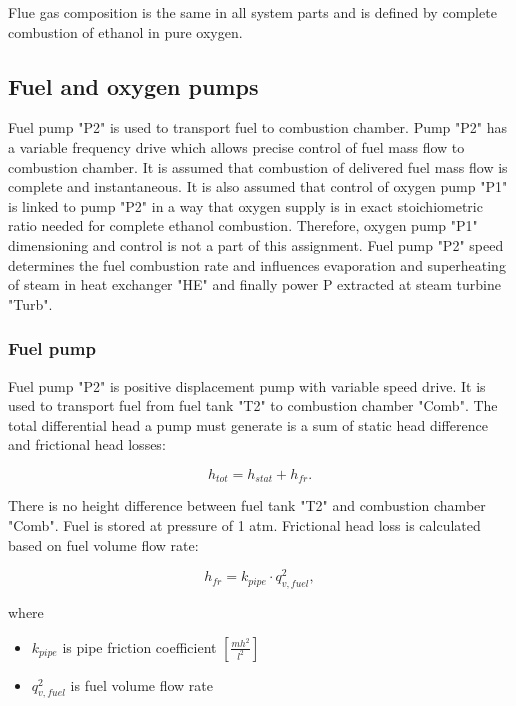 \documentclass[openany]{book}
\begin{document}
	\noindent
	Flue gas composition is the same in all system parts and is defined by 
	complete combustion of ethanol in pure oxygen.
	
	\subsection{Fuel and oxygen pumps}
	
	Fuel pump "P2" is used to transport fuel to combustion chamber. Pump "P2" 
	has a variable frequency drive which allows precise control of fuel mass 
	flow to combustion chamber. It is assumed that combustion of delivered fuel 
	mass flow is complete and instantaneous. It is also assumed that control of 
	oxygen pump "P1" is linked to pump "P2" in a way that oxygen supply is in 
	exact stoichiometric ratio needed for complete ethanol combustion. 
	Therefore, oxygen pump "P1" dimensioning and control is not a part of this 
	assignment. 
	Fuel pump "P2" speed determines the fuel combustion rate and influences 
	evaporation and superheating of steam in heat exchanger "HE" and finally 
	power P extracted at steam turbine "Turb".
	
	\subsubsection*{Fuel pump}
	
	Fuel pump "P2" is positive displacement pump with variable speed drive. It 
	is used to transport fuel from fuel tank "T2" to combustion chamber "Comb". 
	The total differential head a pump must generate is a sum of static head 
	difference and frictional head losses: 
	
	\begin{equation}\label{eq:head_total}
	h_{tot} = h_{stat} + h_{fr}.
	\end{equation}
	
	There is no height difference between fuel tank "T2" and combustion chamber 
	"Comb". Fuel is stored at pressure of 1 atm.
	Frictional head loss is calculated based on fuel volume flow rate:
	
	\begin{equation}\label{eq:head_loss}
	h_{fr} = k_{pipe} \cdot q_{v,fuel}^2,
	\end{equation}
	
	\noindent
	where
	
	\begin{itemize}
		\item $k_{pipe}$ is pipe friction coefficient $\left[ \frac{mh^2}{l^2} 
		\right]$
		\item $q_{v,fuel}^2$ is fuel volume flow rate
	\end{itemize}
	
\end{document}
